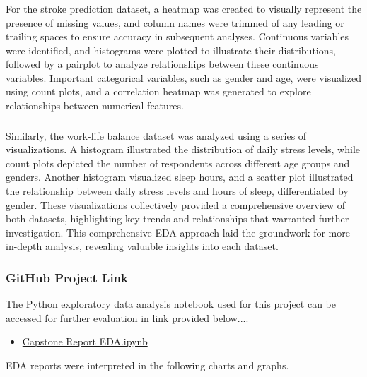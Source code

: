 \documentclass[runningheads]{llncs}
\begin{document}
\begin{enumerate}
\subsubsection{}
For the stroke prediction dataset, a heatmap was created to visually represent the presence of missing values, and column names were trimmed of any leading or trailing spaces to ensure accuracy in subsequent analyses. Continuous variables were identified, and histograms were plotted to illustrate their distributions, followed by a pairplot to analyze relationships between these continuous variables. Important categorical variables, such as gender and age, were visualized using count plots, and a correlation heatmap was generated to explore relationships between numerical features. 

\subsubsection{}
Similarly, the work-life balance dataset was analyzed using a series of visualizations. A histogram illustrated the distribution of daily stress levels, while count plots depicted the number of respondents across different age groups and genders. Another histogram visualized sleep hours, and a scatter plot illustrated the relationship between daily stress levels and hours of sleep, differentiated by gender. These visualizations collectively provided a comprehensive overview of both datasets, highlighting key trends and relationships that warranted further investigation. This comprehensive EDA approach laid the groundwork for more in-depth analysis, revealing valuable insights into each dataset.

\subsubsection*{GitHub Project Link}
The Python exploratory data analysis notebook used for this project can be accessed for further evaluation in link provided below....
\begin{itemize}
    \item \href{https://github.com/alvaroquintero28/Capstone-Project-Report/blob/main/EDA.ipynb}{Capstone Report EDA.ipynb}  
\end{itemize}

 EDA reports were interpreted in the following charts and graphs.


\end{enumerate}
\end{document}

